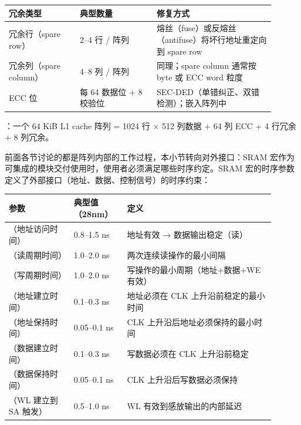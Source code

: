 \begin{longtable}{L{0.24\linewidth}L{0.26\linewidth}L{0.40\linewidth}}
\toprule
冗余类型 & 典型数量 & 修复方式 \\
\midrule
冗余行（spare row） & 2--4 行 / 阵列 & 熔丝（fuse）或反熔丝（antifuse）将坏行地址重定向到 spare row \\
冗余列（spare column） & 4--8 列 / 阵列 & 同理；spare column 通常按 byte 或 ECC word 粒度 \\
ECC 位 & 每 64 数据位 + 8 校验位 & SEC-DED（单错纠正、双错检测）；嵌入阵列中 \\
\bottomrule
\end{longtable}

：一个 64 KiB L1 cache 阵列 = 1024 行 $\times$ 512 列数据 + 64 列 ECC + 4 行冗余 + 8 列冗余。


前面各节讨论的都是阵列内部的工作过程，本小节转向对外接口：SRAM 宏作为可集成的模块交付使用时，使用者必须满足哪些时序约定。SRAM 宏的时序参数定义了外部接口（地址、数据、控制信号）的时序约束：

\begin{longtable}{L{0.22\linewidth}L{0.18\linewidth}L{0.50\linewidth}}
\toprule
参数 & 典型值（28nm） & 定义 \\
\midrule
{}（地址访问时间） & 0.8--1.5 ns & 地址有效 → 数据输出稳定（读） \\
（读周期时间） & 1.0--2.0 ns & 两次连续读操作的最小间隔 \\
（写周期时间） & 1.0--2.0 ns & 写操作的最小周期（地址+数据+WE 有效） \\
（地址建立时间） & 0.1--0.3 ns & 地址必须在 CLK 上升沿前稳定的最小时间 \\
（地址保持时间） & 0.05--0.1 ns & CLK 上升沿后地址必须保持的最小时间 \\
（数据建立时间） & 0.1--0.3 ns & 写数据必须在 CLK 上升沿前稳定 \\
（数据保持时间） & 0.05--0.1 ns & CLK 上升沿后写数据必须保持 \\
（WL 建立到 SA 触发） & 0.5--1.0 ns & WL 有效到感放输出的内部延迟 \\
\bottomrule
\end{longtable}


